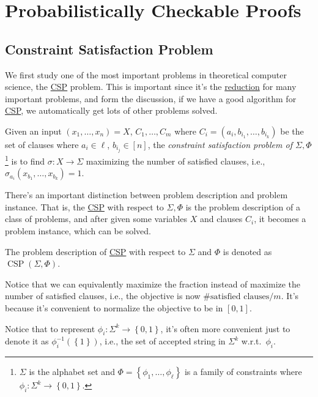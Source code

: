 \section{Probabilistically Checkable Proofs}
\subsection{Constraint Satisfaction Problem}
We first study one of the most important problems in theoretical computer science, the \hyperref[prb:CSP]{CSP} problem. This is important since it's the \hyperref[def:reduction]{reduction} for many important problems, and form the discussion, if we have a good algorithm for \hyperref[prb:CSP]{CSP}, we automatically get lots of other problems solved.

\begin{problem}[CSP]\label{prb:CSP}
Given an input \((x_1, \ldots , x_n) = X\), \(C_1, \ldots  , C_m\) where \(C_i = (a_i, b_{i_1}, \ldots , b_{i_k})\) be the set of clauses where \(a_i\in {\ell }\), \(b_{i_j}\in [n]\), the \emph{constraint satisfaction problem of \(\Sigma, \Phi \)}\footnote{\(\Sigma \) is the alphabet set and \(\Phi = \left\{ \phi _1, \ldots , \phi _{\ell }  \right\} \) is a family of constraints where \(\phi _i \colon \Sigma ^k \to \left\{ 0, 1 \right\} \).} is to find \(\sigma \colon X\to \Sigma \) maximizing the number of satisfied clauses, i.e., \(\sigma _{a_i}(x_{b_1},\ldots , x_{b_k} )=1\).
\end{problem}

There's an important distinction between problem description and problem instance. That is, the \hyperref[prb:CSP]{CSP} with respect to \(\Sigma, \Phi \) is the problem description of a class of problems, and after given some variables \(X\) and clauses \(C_i\), it becomes a problem instance, which can be solved.

\begin{notation}
	The problem description of \hyperref[prb:CSP]{CSP} with respect to \(\Sigma \) and \(\Phi \) is denoted as \(\mathop{\mathrm{CSP}}(\Sigma , \Phi )\).
\end{notation}

Notice that we can equivalently maximize the fraction instead of maximize the number of satisfied clauses, i.e., the objective is now \(\#\text{satisfied clauses} / m \). It's because it's convenient to normalize the objective to be in \([0, 1]\).

\begin{note}
	Notice that to represent \(\phi _i \colon \Sigma ^k \to \left\{ 0, 1 \right\} \), it's often more convenient just to denote it as \(\phi _i ^{-1} (\left\{ 1 \right\} )\), i.e., the set of accepted string in \(\Sigma ^k\) w.r.t.\  \(\phi _i\).
\end{note}

